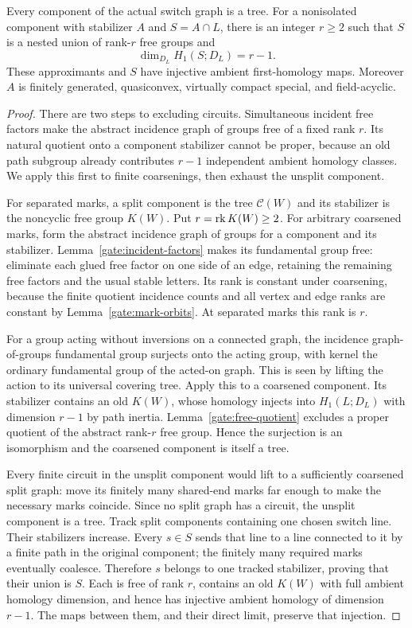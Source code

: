 \begin{proposition}\label{gate:component-tree}
Every component of the actual switch graph is a tree.  For a nonisolated
component with stabilizer $A$ and $S=A\cap L$, there is an integer $r\ge2$
such that $S$ is a nested union of rank-$r$ free groups and
\[
 \dim_{D_L}H_1(S;D_L)=r-1.
\]
These approximants and $S$ have injective ambient first-homology maps.
Moreover $A$ is finitely generated, quasiconvex, virtually compact special,
and field-acyclic.
\end{proposition}
\begin{proof}
There are two steps to excluding circuits. Simultaneous incident free
factors make the abstract incidence graph of groups free of a fixed
rank \(r\). Its natural quotient onto a component stabilizer cannot
be proper, because an old path subgroup already contributes
\(r-1\) independent ambient homology classes. We apply this first
to finite coarsenings, then exhaust the unsplit component.

For separated marks, a split component is the tree $\mathcal C(W)$ and
its stabilizer is the noncyclic free group $K(W)$.  Put $r=\operatorname{rk} K(W)\ge2$.
For arbitrary coarsened marks, form the abstract incidence graph of groups
for a component and its stabilizer.  Lemma~\ref{gate:incident-factors}
makes its fundamental group free: eliminate each glued free factor on
one side of an edge, retaining the remaining free factors and the usual
stable letters.  Its rank is constant under coarsening, because the
finite quotient incidence counts and all vertex and edge ranks are
constant by Lemma~\ref{gate:mark-orbits}.  At separated marks this rank
is $r$.

For a group acting without inversions on a connected graph, the incidence
graph-of-groups fundamental group surjects onto the acting group, with
kernel the ordinary fundamental group of the acted-on graph.  This is
seen by lifting the action to its universal covering tree.  Apply this
to a coarsened component.  Its stabilizer contains an old $K(W)$, whose
homology injects into $H_1(L;D_L)$ with dimension $r-1$ by path inertia.
Lemma~\ref{gate:free-quotient} excludes a proper quotient of the abstract
rank-$r$ free group.  Hence the surjection is an isomorphism and the
coarsened component is itself a tree.

Every finite circuit in the unsplit component would lift to a sufficiently
coarsened split graph: move its finitely many shared-end marks far enough
to make the necessary marks coincide.  Since no split graph has a circuit,
the unsplit component is a tree.  Track split components containing one
chosen switch line.  Their stabilizers increase.  Every $s\in S$ sends
that line to a line connected to it by a finite path in the original
component; the finitely many required marks eventually coalesce.
Therefore $s$ belongs to one tracked stabilizer, proving that their union
is $S$.  Each is free of rank $r$, contains an old $K(W)$ with full ambient
homology dimension, and hence has injective ambient homology of dimension
$r-1$.  The maps between them, and their direct limit, preserve that
injection.


\end{proof}
